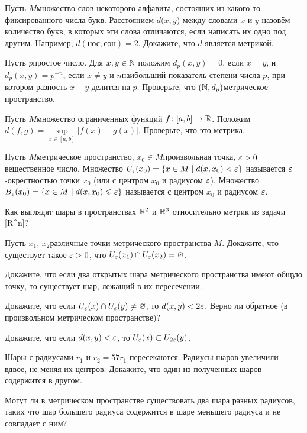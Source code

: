 \documentclass[a4paper,12pt]{article}
\begin{document}
Пусть $M$\т множество слов некоторого алфавита, состоящих из какого-то фиксированного числа букв. Расстоянием $d (x,y$) между словами $x$ и $y$ назовём количество букв, в которых эти слова отличаются, если написать их одно под другим. Например, $d(\text{нос},\text{сон}) = 2$. Докажите, что $d$ является метрикой.

Пусть $p$\т простое число. Для $x, y \in \mathbb{N}$ положим $d_p(x,y) = 0$, если $x = y$, и $d_p(x,y) = p^{-n}$, если $x \ne y$ и $n$\т наибольший показатель степени числа $p$, при котором разность $x-y$ делится на $p$. Проверьте, что $(\mathbb{N}, d_p)$\т метрическое пространство.

\label{C}
Пусть $M$\т множество ограниченных функций $f\colon [a,b] \rightarrow \mathbb{R}$. Положим $d (f,g) = \sup\limits_{x\in [a,b]}|f(x) - g(x)|$. Проверьте, что это метрика.

Пусть $M$\т метрическое пространство, $x_0\in M$\т произвольная точка, $\varepsilon > 0$\т вещественное число. Множество $U_\varepsilon(x_0) = \{ x\in M \mid d(x, x_0) < \varepsilon\}$ называется $\varepsilon$-окрестностью точки $x_0$ (или  с центром $x_0$ и радиусом $\varepsilon$).
Множество $B_\varepsilon(x_0) = \{ x\in M \mid d(x,x_0)\leqslant\varepsilon\}$ называется  с центром $x_0$ и радиусом $\varepsilon$.

Как выглядят шары в пространствах $\mathbb{R}^2$ и $\mathbb{R}^3$ относительно метрик из
задачи \ref{R^n}?

Пусть $x_1$, $x_2$\т различные точки метрического пространства $M$. Докажите, что существует такое $\varepsilon > 0$, что $U_\varepsilon(x_1) \cap U_\varepsilon(x_2) = \varnothing$.

Докажите, что если два открытых шара метрического пространства имеют общую точку, то существует шар, лежащий в их пересечении.

Докажите, что если $U_{\varepsilon}(x) \cap U_{\varepsilon}(y) \ne \varnothing$, то $d (x,y) < 2\varepsilon$. Верно ли обратное (в произвольном метрическом пространстве)?

Докажите, что если $d(x,y) < \varepsilon$, то $U_\varepsilon(x) \subset U_{2\varepsilon}(y)$.

Шары с радиусами $r_1$ и $r_2 = 57 r_1$ пересекаются. Радиусы шаров увеличили вдвое, не меняя их центров. Докажите, что один из полученных шаров содержится в другом.

Могут ли в метрическом пространстве существовать два шара разных радиусов, таких что шар большего радиуса содержится в шаре меньшего радиуса и не совпадает с ним?
\end{document}
